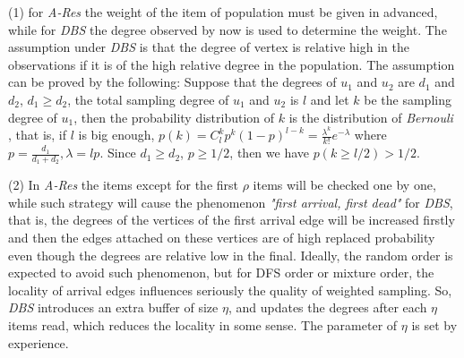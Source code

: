 \documentclass{sig-alternate-2013}
\begin{document}
(1)  for \textit{A-Res} the weight of the item of population must be given in advanced, while for \textit{DBS} the degree observed by now is used to determine the weight. The assumption under \textit{DBS} is that  the degree of vertex is relative high in the observations if it is of the high relative degree in the population.  The assumption can be proved by the following:
Suppose that the degrees of $u_1$ and $u_2$ are $d_1$ and $d_2$, $d_1\ge d_2$,  the total sampling degree of  $u_1$ and $u_2$ is $l$ and let $k$ be the sampling degree of $u_1$, then the probability distribution of $k$ is the distribution of \textit{Bernouli} , that is, if $l$ is big enough,  $ p(k)=C_l^k p^k(1-p)^{l-k} = \frac{\lambda^k}{k!} e^{-\lambda}$ where $p=\frac{d_1}{d_1+d_2}, \lambda = l p$. Since $d_1\ge d_2$, $p\ge1/2$, then we have $p(k\ge l/2)>1/2$.

(2)  In \textit{A-Res} the items except for the first $\rho$ items will be checked one by one, while such strategy will cause the phenomenon \textit{"first arrival, first dead"} for \textit{DBS}, that is,  the degrees of the vertices of the first arrival edge will be increased firstly and then the edges attached on these vertices are of high replaced probability even though the degrees are relative low in the final. Ideally, the random order is expected to avoid such phenomenon, but for DFS order or mixture order, the locality of arrival edges influences seriously the quality of weighted sampling. So, \textit{DBS} introduces an extra buffer of size $\eta$, and updates the degrees after each $\eta$ items read, which reduces the locality in some sense. The parameter of $\eta$ is set by experience. %
\end{document}
